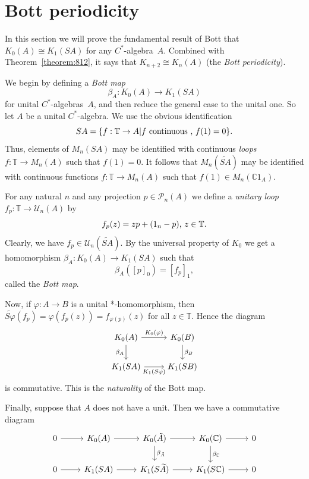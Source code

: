 \documentclass{book}
\def\cstar{\(C^*\)-algebra}
\def\cstars{\(C^*\)-algebras}
\begin{document}
\section{Bott periodicity}
In this section we will prove the fundamental result of Bott that \(K_0(A)\cong K_1(S A)\) for any \cstar\ \(A\).
Combined with Theorem~\ref{theorem:812}, it says that \(K_{n+2}\cong K_n(A)\) (the \textit{Bott periodicity}).\par
We begin by defining a \textit{Bott map}
\[
  \beta_A:K_0(A)\rightarrow K_1(S A)
\]
for unital \cstars\ \(A\), and then reduce the general case to the unital one. So let \(A\) be a unital \cstar. We use the obvious identification
\[
  S A=\{f:\mathbb{T}\rightarrow A| f\textnormal{ continuous , } f(1)=0\}.
\]
Thus, elements of \(M_n(S A)\) may be identified with continuous \textit{loops} \(f:\mathbb{T}\rightarrow M_n(A)\)
such that \(f(1)=0\). It follows that \(M_n(\widetilde{S A})\) may be identified with continuous functions \(f:\mathbb{T}\rightarrow M_n(A)\)
  such that \(f(1)\in M_n(\mathbb{C}1_A)\).\par
For any natural \(n\) and any projection \(p\in\mathcal{P}_n(A)\) we define a \textit{unitary loop} \(f_p:\mathbb{T}\rightarrow \mathcal{U}_n(A)\) by
\[
  f_p(z)=zp+(1_n-p)\textnormal{, }z\in\mathbb{T}.
\]
Clearly, we have \(f_p\in\mathcal{U}_n(\widetilde{S A})\). By the universal property of \(K_0\) we get a homomorphism
\(\beta_A :K_0(A)\rightarrow K_1(S A)\) such that
\[
  \beta_A({[p]}_0)={[f_p]}_1,
\]
called the \textit{Bott map}.\par
Now, if \(\varphi:A\rightarrow B\) is a unital *-homomorphism, then \(\tilde{S\varphi}(f_p)=\varphi(f_p(z))=f_{\varphi(p)}(z)\)
for all \(z\in\mathbb{T}\). Hence the diagram
\begin{equation}\label{diag:825}
  \begin{tikzcd}
    K_0(A)\arrow[r,"K_0(\varphi)"]\arrow[d,"\beta_A",swap]&K_0(B)\arrow[d,"\beta_B"]\\
    K_1(S A)\arrow[r,"K_1(S\varphi)",swap]&K_1(S B)
  \end{tikzcd}
\end{equation}
is commutative. This is the \textit{naturality} of the Bott map.\par
Finally, suppose that \(A\) does not have a unit. Then we have a commutative diagram
\begin{equation}\label{diag:826}
  \begin{tikzcd}
    0\arrow[r]&K_0(A)\arrow[r]&K_0(\tilde{A})\arrow[d,"\beta_{\tilde{A}}"]\arrow[r]&K_0(\mathbb{C})\arrow[r]\arrow[d,"\beta_{\mathbb{C}}"]&0\\
    0\arrow[r]&K_1(S A)\arrow[r]&K_1(S \widetilde{A})\arrow[r]&K_1(S\mathbb{C})\arrow[r]&0
  \end{tikzcd}
\end{equation}
\end{document}
